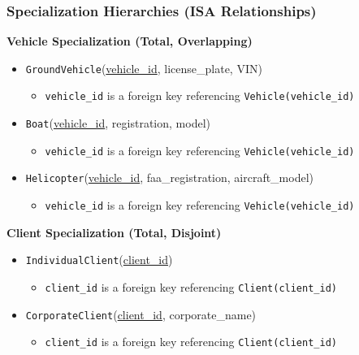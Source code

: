 \documentclass[12pt]{article}
\begin{document}
\subsubsection{Specialization Hierarchies (ISA Relationships)}

\textbf{Vehicle Specialization (Total, Overlapping)}
\begin{itemize}
    \item \texttt{GroundVehicle}(\underline{vehicle\_id}, license\_plate, VIN)
    \begin{itemize}
        \item \texttt{vehicle\_id} is a foreign key referencing \texttt{Vehicle(vehicle\_id)}
    \end{itemize}
    \item \texttt{Boat}(\underline{vehicle\_id}, registration, model)
    \begin{itemize}
        \item \texttt{vehicle\_id} is a foreign key referencing \texttt{Vehicle(vehicle\_id)}
    \end{itemize}
    \item \texttt{Helicopter}(\underline{vehicle\_id}, faa\_registration, aircraft\_model)
    \begin{itemize}
        \item \texttt{vehicle\_id} is a foreign key referencing \texttt{Vehicle(vehicle\_id)}
    \end{itemize}
\end{itemize}

\textbf{Client Specialization (Total, Disjoint)}
\begin{itemize}
    \item \texttt{IndividualClient}(\underline{client\_id})
    \begin{itemize}
        \item \texttt{client\_id} is a foreign key referencing \texttt{Client(client\_id)}
    \end{itemize}
    \item \texttt{CorporateClient}(\underline{client\_id}, corporate\_name)
    \begin{itemize}
        \item \texttt{client\_id} is a foreign key referencing \texttt{Client(client\_id)}
    \end{itemize}
\end{itemize}

\newpage
\end{document}
